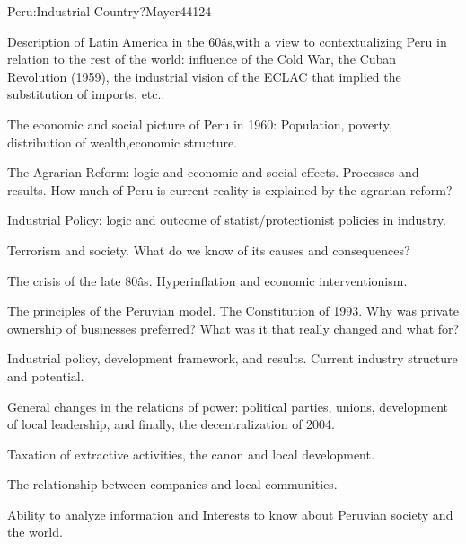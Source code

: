 \begin{syllabus}
\begin{unit}{Peru:Industrial Country?}{}{Mayer44}{12}{4}
   \begin{topics}
      \item Description of Latin America in the 60âs,with a view to contextualizing Peru in relation to the rest of the world: influence of the Cold War, the Cuban Revolution (1959), the industrial vision of the ECLAC that implied the substitution of imports, etc..
      \item The economic and social picture of Peru in 1960: Population, poverty, distribution of wealth,economic structure.
      \item The Agrarian Reform: logic and economic and social effects. Processes and results. How much of Peru is current reality is explained by the agrarian reform?
      \item Industrial Policy: logic and outcome of statist/protectionist policies in industry.
      \item Terrorism and society. What do we know of its causes and consequences?
      \item The crisis of the late 80âs. Hyperinflation and economic interventionism.
      \item The principles of the Peruvian model. The Constitution of 1993. Why was private ownership of businesses preferred? What was it that really changed and what for?
      \item Industrial policy, development framework, and results. Current industry structure and potential.
      \item General changes in the relations of power: political parties, unions, development of local leadership, and finally, the decentralization of 2004.
      \item Taxation of extractive activities, the canon and local development.
      \item The relationship between companies and local communities.
   \end{topics}
   \begin{learningoutcomes}
      \item Ability to analyze information and Interests to know about Peruvian society and the world.
   \end{learningoutcomes}
\end{unit}

\begin{coursebibliography}
\end{coursebibliography}

\end{syllabus}
